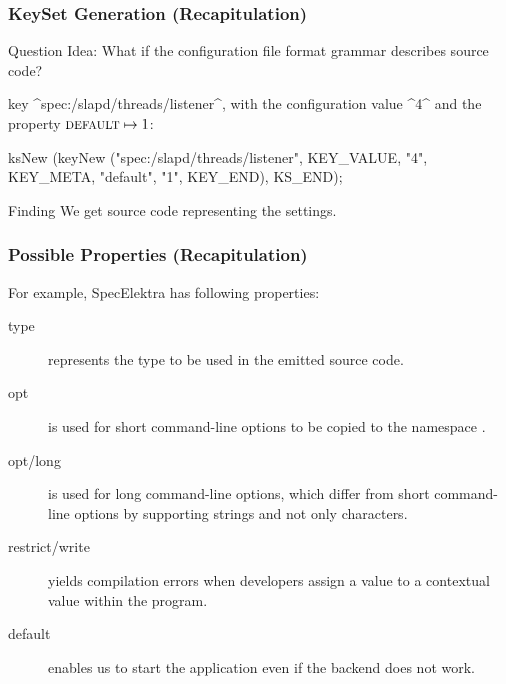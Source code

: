 \begin{frame}[fragile]
	\frametitle{KeySet Generation (Recapitulation)}
	\begin{alertblock}{Question}
	Idea: What if the configuration file format grammar describes source code?
	\end{alertblock}

	\pause

	key ^spec:/slapd/threads/listener^, with the configuration value ^4^ and the property ${\textsc{default}} \mapsto 1$:

	\begin{code}[gobble=4,language=Cpp]
	ksNew (keyNew ("spec:/slapd/threads/listener",
		       KEY_VALUE, "4",
		       KEY_META, "default", "1",
		       KEY_END),
	       KS_END);
	\end{code}

	\begin{alertblock}{Finding}
	We get source code representing the settings.
	\end{alertblock}
\end{frame}

\begin{frame}
	\frametitle{Possible Properties (Recapitulation)}

	\pause

	For example, SpecElektra has following properties:
	\begin{description}
	\item[type] represents the type to be used in the emitted source code.
	\item[opt] is used for short command-line options to be copied to the namespace .
	\item[opt/long] is used for long command-line options, which differ from short command-line options by supporting strings and not only characters.
	\item[restrict/write] yields compilation errors when developers assign a value to a contextual value within the program.
	\item[default] enables us to start the application even if the backend does not work.
	\end{description}
\end{frame}

